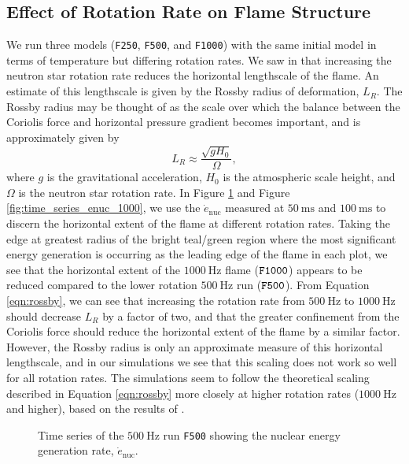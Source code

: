 \documentclass[preprint,times,tighten]{aastex63}
\begin{document}
\subsection{Effect of Rotation Rate on Flame Structure}\label{ssec:rot_structure}

We run three models ({\tt F250}, {\tt F500}, and {\tt F1000}) with the same initial model in terms 
of temperature but differing rotation rates. We saw in \citet{flame_wave1} that 
increasing the neutron star rotation rate reduces the horizontal lengthscale of the flame. An 
estimate of this lengthscale is given by the Rossby radius of deformation, $L_R$. The Rossby radius 
may be thought of as the scale over which the balance between the Coriolis force and horizontal 
pressure gradient becomes important, and is approximately given by
\begin{equation}
	\label{eqn:rossby}
	L_R \approx \frac{\sqrt{g H_0}}{\Omega},
\end{equation}
where $g$ is the gravitational acceleration, $H_0$ is the atmospheric scale height, and $\Omega$ is the 
neutron star rotation rate. In Figure \ref{fig:time_series_enuc_500} and Figure 
\ref{fig:time_series_enuc_1000}, we use the $\dot{e}_\mathrm{nuc}$ measured at $50~\mathrm{ms}$ and $100~\mathrm{ms}$ to discern the horizontal extent of the flame at different rotation rates. Taking the edge at greatest radius of the bright teal/green region where the most significant energy generation is occurring as the leading edge of the flame in each plot, we see that the horizontal extent of the $1000~\mathrm{Hz}$ flame ($\tt{F1000}$) appears to be 
reduced compared to the lower rotation $500~\mathrm{Hz}$ run ($\tt{F500}$). From Equation 
\ref{eqn:rossby}, we can see that increasing the rotation rate from $500~\mathrm{Hz}$ to 
$1000~\mathrm{Hz}$ should decrease $L_R$ by a factor of two, and that the greater confinement from 
the Coriolis force should reduce the horizontal extent of the flame by a similar factor. However, 
the Rossby radius is only an approximate measure of this horizontal lengthscale, and in our 
simulations we see that this scaling does not work so well for all rotation rates. The simulations 
seem to follow the theoretical scaling described in Equation \ref{eqn:rossby} more closely at 
higher rotation rates ($1000~\mathrm{Hz}$ and higher), based on the results of \citet{flame_wave1}.

\begin{figure}[t]
\centering
{}
\caption{\label{fig:time_series_enuc_500} Time series of the $500~\mathrm{Hz}$ run {\tt F500} showing the nuclear energy generation rate, $\dot{e}_\mathrm{nuc}$.}
\end{figure}
\end{document}
